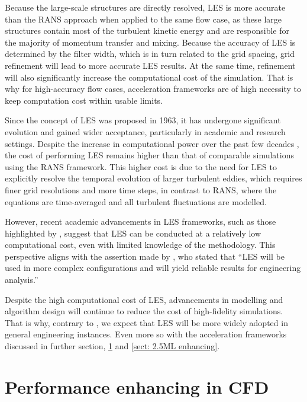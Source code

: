 Because the large-scale structures are directly resolved, LES is more accurate than the RANS approach when applied to the same flow case, as these large structures contain most of the turbulent kinetic energy and are responsible for the majority of momentum transfer and mixing. Because the accuracy of LES is determined by the filter width, which is in turn related to the grid spacing, grid refinement will lead to more accurate LES results. At the same time, refinement will also significantly increase the computational cost of the simulation. That is why for high-accuracy flow cases, acceleration frameworks are of high necessity to keep computation cost within usable limits. 

Since the concept of LES was proposed in 1963, it has undergone significant evolution and gained wider acceptance, particularly in academic and research settings. Despite the increase in computational power over the past few decades \cite{Shalf2020}, the cost of performing LES remains higher than that of comparable simulations using the RANS framework. This higher cost is due to the need for LES to explicitly resolve the temporal evolution of larger turbulent eddies, which requires finer grid resolutions and more time steps, in contrast to RANS, where the equations are time-averaged and all turbulent fluctuations are modelled.

However, recent academic advancements in LES frameworks, such as those highlighted by \textcite{Weymouth2025}, suggest that LES can be conducted at a relatively low computational cost, even with limited knowledge of the methodology. This perspective aligns with the assertion made by \textcite{Piomelli2014}, who stated that “LES will be used in more complex configurations and will yield reliable results for engineering analysis.”

Despite the high computational cost of LES, advancements in modelling and algorithm design will continue to reduce the cost of high-fidelity simulations. That is why, contrary to \textcite{Zhiyin2015}, we expect that LES will be more widely adopted in general engineering instances. Even more so with the acceleration frameworks discussed in further section, \ref{sect: 2.4performance enhancing} and \ref{sect: 2.5ML enhancing}.

\section{Performance enhancing in CFD}
\label{sect: 2.4performance enhancing}

